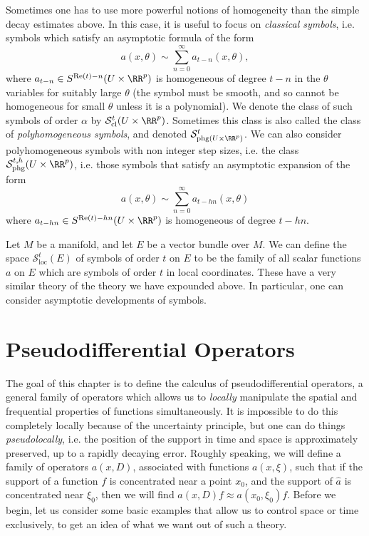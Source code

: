 Sometimes one has to use more powerful notions of homogeneity than the simple decay estimates above. In this case, it is useful to focus on \emph{classical symbols}, i.e. symbols which satisfy an asymptotic formula of the form
%
\[ a(x,\theta) \sim \sum_{n = 0}^\infty a_{t-n}(x,\theta), \]
%
where $a_{t-n} \in S^{\text{Re}(t) - n}(U \times \RR^p)$ is homogeneous of degree $t-n$ in the $\theta$ variables for suitably large $\theta$ (the symbol must be smooth, and so cannot be homogeneous for small $\theta$ unless it is a polynomial). We denote the class of such symbols of order $\alpha$ by $\mathcal{S}^t_{\text{cl}}(U \times \RR^p)$. Sometimes this class is also called the class of \emph{polyhomogeneous symbols}, and denoted $\mathcal{S}^t_{\text{phg}(U \times \RR^p)}$. We can also consider polyhomogeneous symbols with non integer step sizes, i.e. the class $\mathcal{S}^{t,h}_{\text{phg}}(U \times \RR^p)$, i.e. those symbols that satisfy an asymptotic expansion of the form
%
\[ a(x,\theta) \sim \sum_{n = 0}^\infty a_{t - hn}(x,\theta) \]
%
where $a_{t-hn} \in S^{\text{Re}(t) - hn}(U \times \RR^p)$ is homogeneous of degree $t-hn$.

\begin{remark}
    Let $M$ be a manifold, and let $E$ be a vector bundle over $M$. We can define the space $\mathcal{S}^t_{\text{loc}}(E)$ of symbols of order $t$ on $E$ to be the family of all scalar functions $a$ on $E$ which are symbols of order $t$ in local coordinates. These have a very similar theory of the theory we have expounded above. In particular, one can consider asymptotic developments of symbols.
\end{remark}












\chapter{Pseudodifferential Operators}

The goal of this chapter is to define the calculus of pseudodifferential operators, a general family of operators which allows us to \emph{locally} manipulate the spatial and frequential properties of functions simultaneously. It is impossible to do this completely locally because of the uncertainty principle, but one can do things \emph{pseudolocally}, i.e. the position of the support in time and space is approximately preserved, up to a rapidly decaying error. Roughly speaking, we will define a family of operators $a(x,D)$, associated with functions $a(x,\xi)$, such that if the support of a function $f$ is concentrated near a point $x_0$, and the support of $\widehat{a}$ is concentrated near $\xi_0$, then we will find $a(x,D) f \approx a(x_0,\xi_0) f$. Before we begin, let us consider some basic examples that allow us to control space or time exclusively, to get an idea of what we want out of such a theory.

